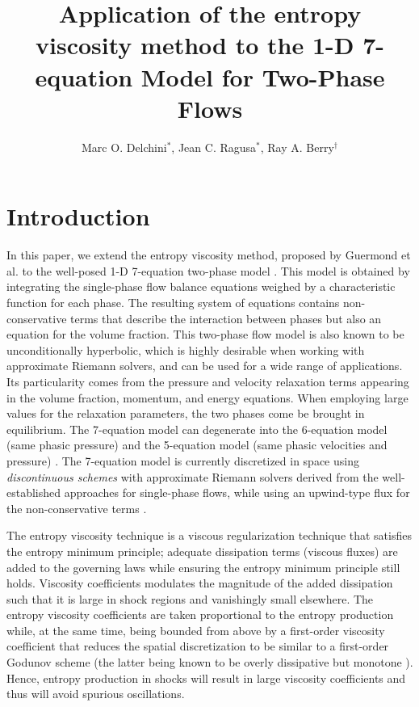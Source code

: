 \documentclass{anstrans}
\title{Application of the entropy viscosity method to the 1-D 7-equation Model for Two-Phase Flows}
\author{Marc O. Delchini$^{*}$, Jean C. Ragusa$^{*}$, Ray A. Berry$^\dagger$}
\institute{
$^{*}$Department of Nuclear Engineering, Texas A\&M University, 
$^\dagger$Idaho National Laboratory
}
\begin{document}
\section{Introduction}
%
In this paper, we extend the entropy viscosity method, proposed by Guermond et al. \cite{jlg1, jlg2}
to the well-posed 1-D 7-equation two-phase model \cite{DEM, berry}. This model is obtained by integrating the single-phase flow balance equations weighed by a characteristic function for each phase. The resulting system of equations contains non-conservative terms that describe the interaction between phases but also an equation for the volume fraction. This two-phase flow model is also known to be unconditionally hyperbolic, which is highly desirable when working with approximate Riemann solvers, and can be used for a wide range of applications. Its particularity comes from the pressure and velocity relaxation terms appearing in the volume fraction, momentum, and energy equations. When employing large values for the relaxation parameters, the two phases come be brought in equilibrium. The 7-equation model can degenerate into the 6-equation model (same phasic pressure) \cite{Toumi_1996} and the 5-equation model (same phasic velocities and pressure) \cite{Kapila_2001}. The 7-equation model is currently discretized in space using \emph{discontinuous schemes} with approximate Riemann solvers derived from the well-established approaches for single-phase flows, while using an upwind-type flux for the non-conservative terms \cite{Saurel_2001a, Saurel_2001b, Li_2004, Zein_2010, Ambroso_2012}. 

The entropy viscosity technique is a viscous regularization technique
that satisfies the entropy minimum principle; adequate dissipation terms (viscous fluxes)
are added to the governing laws while ensuring the entropy minimum principle still holds.
Viscosity coefficients modulates the magnitude of the added dissipation such that it is
large in shock regions and vanishingly small elsewhere. The entropy viscosity coefficients
are taken proportional to the entropy production while, at the same time, being bounded
from above by a first-order viscosity coefficient that reduces the spatial discretization
to be similar to a first-order Godunov scheme (the latter being known to be overly dissipative but
monotone \cite{toro}). Hence, entropy production in shocks will result in large viscosity  
coefficients and thus will avoid spurious oscillations. 
\end{document}
